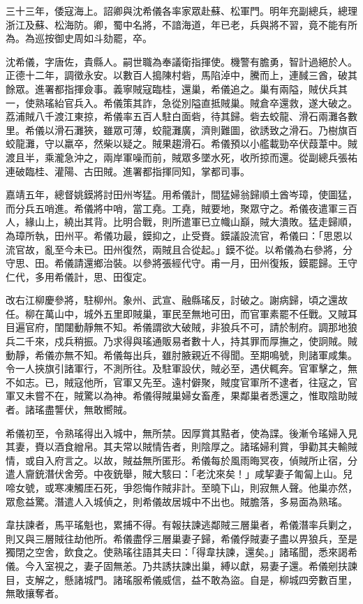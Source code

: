 \begin{pinyinscope}
三十三年，倭寇海上。詔卿與沈希儀各率家眾赴蘇、松軍門。明年充副總兵，總理浙江及蘇、松海防。卿，蜀中名將，不諳海道，年已老，兵與將不習，竟不能有所為。為巡按御史周如斗劾罷，卒。

沈希儀，字唐佐，貴縣人。嗣世職為奉議衛指揮使。機警有膽勇，智計過絕於人。正德十二年，調徵永安。以數百人搗陳村砦，馬陷淖中，騰而上，連馘三酋，破其餘眾。進署都指揮僉事。義寧賊寇臨桂，還巢，希儀追之。巢有兩隘，賊伏兵其一，使熟瑤紿官兵入。希儀策其詐，急從別隘直抵賊巢。賊倉卒還救，遂大破之。荔浦賊八千渡江東掠，希儀率五百人駐白面砦，待其歸。砦去蛟龍、滑石兩灘各數里。希儀以滑石灘狹，雖眾可薄，蛟龍灘廣，濟則難圖，欲誘致之滑石。乃樹旗百蛟龍灘，守以羸卒，然柴以疑之。賊果趨滑石。希儀預以小艦載勁卒伏葭葦中。賊渡且半，乘瀧急沖之，兩岸軍噪而前，賊眾多墜水死，收所掠而還。從副總兵張祐連破臨桂、灌陽、古田賊。進署都指揮同知，掌都司事。

嘉靖五年，總督姚鏌將討田州岑猛。用希儀計，間猛婦翁歸順土酋岑璋，使圖猛，而分兵五哨進。希儀將中哨，當工堯。工堯，賊要地，聚眾守之。希儀夜遣軍三百人，緣山上，繞出其背。比明合戰，則所遣軍已立幟山巔，賊大潰敗。猛走歸順，為璋所執，田州平。希儀功最，鏌抑之，止受賚。鏌議設流官，希儀曰：「思恩以流官故，亂至今未已。田州復然，兩賊且合從起。」鏌不從。以希儀為右參將，分守思、田。希儀請還鄉治裝。以參將張經代守。甫一月，田州復叛，鏌罷歸。王守仁代，多用希儀計，思、田復定。

改右江柳慶參將，駐柳州。象州、武宣、融縣瑤反，討破之。謝病歸，頃之還故任。柳在萬山中，城外五里即賊巢，軍民至無地可田，而官軍素罷不任戰。又賊耳目遍官府，閨闥動靜無不知。希儀謂欲大破賊，非狼兵不可，請於制府。調那地狼兵二千來，戍兵稍振。乃求得與瑤通販易者數十人，持其罪而厚撫之，使詗賊。賊動靜，希儀亦無不知。希儀每出兵，雖肘腋親近不得聞。至期鳴號，則諸軍咸集。令一人挾旗引諸軍行，不測所往。及駐軍設伏，賊必至，遇伏輒奔。官軍擊之，無不如志。已，賊寇他所，官軍又先至。遠村僻聚，賊度官軍所不逮者，往寇之，官軍又未嘗不在，賊驚以為神。希儀得賊巢婦女畜產，果鄰巢者悉還之，惟取陰助賊者。諸瑤盡讋伏，無敢嚮賊。

希儀初至，令熟瑤得出入城中，無所禁。因厚賞其黠者，使為諜。後漸令瑤婦入見其妻，賚以酒食繒帛。其夫常以賊情告者，則陰厚之。諸瑤婦利賞，爭勸其夫輸賊情，或自入府言之。以故，賊益無所匿形。希儀每於風雨晦冥夜，偵賊所止宿，分遣人齎銃潛伏舍旁。中夜銃舉，賊大駭曰：「老沈來矣！」咸挈妻子匍匐上山。兒啼女號，或寒凍觸厓石死，爭怨悔作賊非計。至曉下山，則寂無人聲。他巢亦然，眾愈益驚。潛遣人入城偵之，則希儀故居城中不出也。賊膽落，多易面為熟瑤。

韋扶諫者，馬平瑤魁也，累捕不得。有報扶諫逃鄰賊三層巢者，希儀潛率兵剿之，則又與三層賊往劫他所。希儀盡俘三層巢妻子歸，希儀俘賊妻子盡以畀狼兵，至是獨閉之空舍，飲食之。使熟瑤往語其夫曰：「得韋扶諫，還矣。」諸瑤聞，悉來謁希儀。今入室視之，妻子固無恙。乃共誘扶諫出巢，縛以獻，易妻子還。希儀剜扶諫目，支解之，懸諸城門。諸瑤服希儀威信，益不敢為盜。自是，柳城四旁數百里，無敢攘奪者。


\end{pinyinscope}
